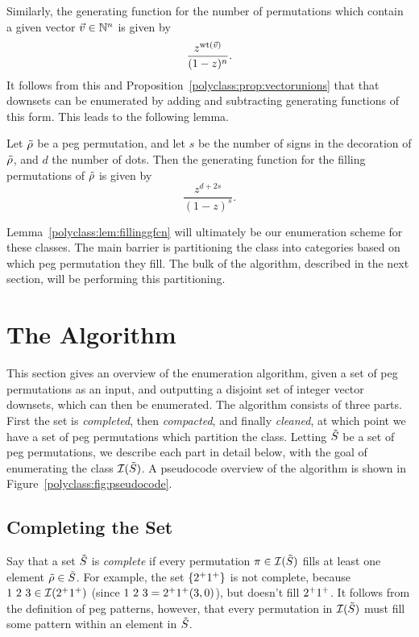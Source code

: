     Similarly, the generating function for the number of permutations which
    contain a given vector $\vec v \in \mathbb{N}^n$ is given by 
    $$ \frac{z^{\operatorname{{wt}}(\vec v)}}{(1 - z)^n} .$$
    It follows from this and Proposition~\ref{polyclass:prop:vectorunions} that
    that downsets can be enumerated by adding and subtracting generating
    functions of this form. This leads to the following lemma. 

    \begin{lemma} \label{polyclass:lem:fillinggfcn}
      Let $\tilde{\rho}$ be a peg permutation, and let $s$ be the number of signs in
      the decoration of $\tilde{\rho}$, and $d$ the number of dots. Then the generating
      function for the filling permutations of $\tilde{\rho}$ is given by 
      $$ \frac{z^{d + 2s}}{(1 - z)^s}.$$ 
    \end{lemma}
    
    Lemma~\ref{polyclass:lem:fillinggfcn} will ultimately be our enumeration
    scheme for these classes. The main barrier is partitioning the class
    into categories based on which peg permutation they fill. The bulk of the
    algorithm, described in the next section, will be performing this
    partitioning. 
        

\section{The Algorithm}
\label{polyclass:sec:algo}

  This section gives an overview of the enumeration algorithm, given a set of
  peg permutations as an input, and outputting a disjoint set of integer vector
  downsets, which can then be enumerated. The algorithm consists of three
  parts. First the set is \emph{completed}, then \emph{compacted}, and finally
  \emph{cleaned}, at which point we have a set of peg permutations which
  partition the class. Letting $\tilde{S}$ be a set of peg permutations, we describe
  each part in detail below, with the goal of enumerating the class $\mathcal{I}(\tilde{S})$.
  A pseudocode overview of the algorithm is shown in
  Figure~\ref{polyclass:fig:pseudocode}.

  \subsection{Completing the Set}
    Say that a set $\tilde{S}$ is \emph{complete} if every permutation $\pi \in
    \mathcal{I}(\tilde{S})$ fills at least one element $\tilde{\rho} \in \tilde{S}$. For example, the set
    $\{2^+ 1^+\}$ is not complete, because $1\ 2\ 3 \in \mathcal{I}(2^+ 1^+)$
    (since $1\ 2\ 3 = 2^+ 1^+ (3,0)$), but doesn't fill $2^+ 1^+$. It
    follows from the definition of peg patterns, however, that every
    permutation in $\mathcal{I}(\tilde{S})$ must fill some pattern within an element in $\tilde{S}$. 

